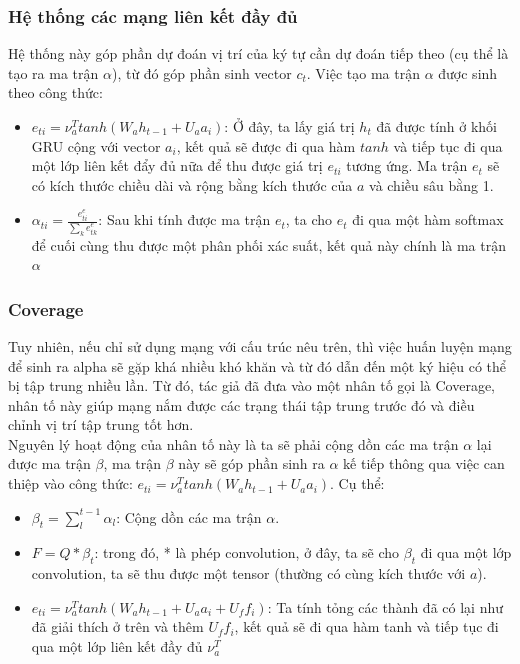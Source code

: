 \documentclass{beamer}
\begin{document}
\begin{frame}
	\frametitle{Hệ thống các mạng liên kết đầy đủ}
	Hệ thống này góp phần dự đoán vị trí của ký tự cần dự đoán tiếp theo (cụ thể là tạo ra ma trận $\alpha$), từ đó góp phần sinh vector $c_t$. Việc tạo ma trận $\alpha$ được sinh theo công thức:\\
	\begin{itemize}
		\item $e_{ti} = \nu_a^Ttanh(W_ah_{t-1} + U_aa_i)$: Ở đây, ta lấy giá trị $h_t$ đã được tính ở khối GRU cộng với vector $a_i$, kết quả sẽ được đi qua hàm $tanh$ và tiếp tục đi qua một lớp liên kết đẩy đủ nữa để thu được giá trị $e_{ti}$ tương ứng. Ma trận $e_t$ sẽ có kích thước chiều dài và rộng bằng kích thước của $a$ và chiều sâu bằng 1.\\
		\item $\alpha_{ti} = \frac{e^e_{ti}}{\sum_k e^e_{tk}}$: Sau khi tính được ma trận $e_t$, ta cho $e_t$ đi qua một hàm softmax để cuối cùng thu được một phân phối xác suất, kết quả này chính là ma trận $\alpha$\\
	\end{itemize}
\end{frame}

\begin{frame}
	\frametitle{Coverage}
	Tuy nhiên, nếu chỉ sử dụng mạng với cấu trúc nêu trên, thì việc huấn luyện mạng để sinh ra alpha sẽ gặp khá nhiều khó khăn và từ đó dẫn đến một ký hiệu có thể bị tập trung nhiều lần. Từ đó, tác giả đã đưa vào một nhân tố gọi là Coverage, nhân tố này giúp mạng nắm được các trạng thái tập trung trước đó và điều chỉnh vị trí tập trung tốt hơn.\\
	Nguyên lý hoạt động của nhân tố này là ta sẽ phải cộng dồn các ma trận $\alpha$ lại được ma trận $\beta$, ma trận $\beta$ này sẽ góp phần sinh ra $\alpha$ kế tiếp thông qua việc can thiệp vào công thức:  $e_{ti} = \nu_a^Ttanh(W_ah_{t-1} + U_aa_i)$. Cụ thể:\\
	\begin{itemize}
		\item $\beta_t = \sum_l^{t-1}\alpha_{l}$: Cộng dồn các ma trận $\alpha$.
		\item $F = Q * \beta_t$: trong đó, * là phép convolution, ở đây, ta sẽ cho $\beta_t$ đi qua một lớp convolution, ta sẽ thu được một tensor (thường có cùng kích thước với $a$).
		\item $e_{ti} = \nu_a^Ttanh(W_ah_{t-1} + U_aa_i + U_ff_i)$: Ta tính tỏng các thành đã có lại như đã giải thích ở trên và thêm $U_ff_i$, kết quả sẽ đi qua hàm tanh và tiếp tục đi qua một lớp liên kết đầy đủ $\nu_a^T$
	\end{itemize}
\end{frame}
\end{document}
